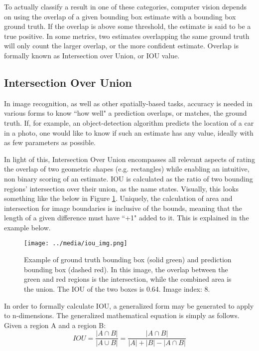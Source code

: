 To actually classify a result in one of these categories, computer vision depends on using the overlap of a given bounding box estimate with a bounding box ground truth. If the overlap is above some threshold, the estimate is said to be a true positive. In some metrics, two estimates overlapping the same ground truth will only count the larger overlap, or the more confident estimate. Overlap is formally known as Intersection over Union, or IOU value.

\subsection{Intersection Over Union}
In image recognition, as well as other spatially-based tasks, accuracy is needed in various forms to know ``how well" a prediction overlaps, or matches, the ground truth. If, for example, an object-detection algorithm predicts the location of a car in a photo, one would like to know if such an estimate has any value, ideally with as few parameters as possible.

In light of this, Intersection Over Union encompasses all relevant aspects of rating the overlap of two geometric shapes (e.g. rectangles) while enabling an intuitive, non binary scoring of an estimate. IOU is calculated as the ratio of two bounding regions' intersection over their union, as the name states. Visually, this looks something like the below in Figure \ref{iou_img}. Uniquely, the calculation of area and intersection for image boundaries is inclusive of the bounds, meaning that the length of a given difference must have ``+1" added to it. This is explained in the example below.

\begin{figure}[ht]
    \texttt{[image: ../media/iou\_img.png]}
    \caption{Example of ground truth bounding box (solid green) and prediction bounding box (dashed red). In this image, the overlap between the green and red regions is the intersection, while the combined area is the union. The IOU of the two boxes is 0.64. Image index: 8.}
    \label{iou_img} %
\end{figure}

In order to formally calculate IOU, a generalized form may be generated to apply to n-dimensions. The generalized mathematical equation is simply as follows. Given a region A and a region B: 
\begin{equation}
IOU = \frac{|A\cap B|}{|A\cup B|} = \frac{|A\cap B|}{|A|+|B|- |A\cap B|}
\end{equation}

